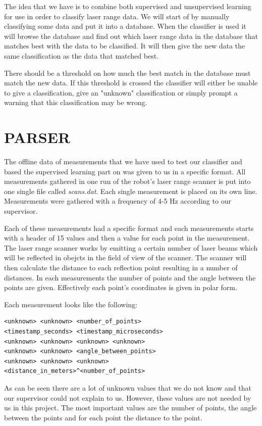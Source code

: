 \documentclass[a4paper, 10pt, conference]{ieeeconf}      %
\begin{document}
The idea that we have is to combine both supervised and unsupervised learning for use in order to classify laser range data. We will start of by manually classifying some data and put it into a database. When the classifier is used it will browse the database and find out which laser range data in the database that matches best with the data to be classified. It will then give the new data the same classification as the data that matched best.

There should be a threshold on how much the best match in the database must match the new data. If this threshold is crossed the classifier will either be unable to give a classification, give an "unknown" classification or simply prompt a warning that this classification may be wrong.

\section{PARSER}
The offline data of measurements that we have used to test our classifier and based the supervised learning part on was given to us in a specific format. All measurements gathered in one run of the robot's laser range scanner is put into one single file called \emph{scans.dat}. Each single measurement is placed on its own line. Measurements were gathered with a frequency of 4-5 Hz according to our supervisor.

Each of these measurements had a specific format and each measurements starts with a header of 15 values and then a value for each point in the measurement. The laser range scanner works by emitting a certain number of laser beams which will be reflected in obejcts in the field of view of the scanner. The scanner will then calculate the distance to each reflection point resulting in a number of distances. In each measurements the number of points and the angle between the points are given. Effectively each point's coordinates is given in polar form.

Each measurement looks like the following:

\begin{verbatim}
<unknown> <unknown> <number_of_points>
<timestamp_seconds> <timestamp_microseconds>
<unknown> <unknown> <unknown> <unknown>
<unknown> <unknown> <angle_between_points>
<unknown> <unknown> <unknown>
<distance_in_meters>^<number_of_points>
\end{verbatim}

As can be seen there are a lot of unknown values that we do not know and that our supervisor could not explain to us. However, these values are not needed by us in this project. The most important values are the number of points, the angle between the points and for each point the distance to the point.
\end{document}
